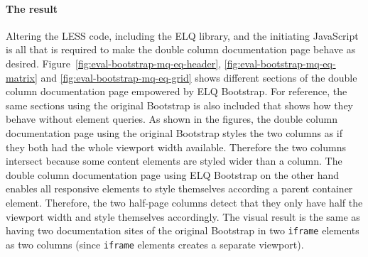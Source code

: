 \documentclass[a4paper,11pt]{kth-mag}
\newcommand{\code}[1]{\texttt{#1}}
\begin{document}
      \paragraph{The result}
      Altering the \gls{LESS} code, including the \gls{ELQ} library, and the initiating \gls{JavaScript} is all that is required to make the double column documentation page behave as desired.
      Figure~\ref{fig:eval-bootstrap-mq-eq-header}, \ref{fig:eval-bootstrap-mq-eq-matrix} and \ref{fig:eval-bootstrap-mq-eq-grid} shows different sections of the double column documentation page empowered by \gls{ELQ} \gls{Bootstrap}.
      For reference, the same sections using the original \gls{Bootstrap} is also included that shows how they behave without element queries.
      As shown in the figures, the double column documentation page using the original \gls{Bootstrap} styles the two columns as if they both had the whole \gls{viewport} width available.
      Therefore the two columns intersect because some content \glspl{element} are styled wider than a column.
      The double column documentation page using \gls{ELQ} \gls{Bootstrap} on the other hand enables all \gls{responsive} \glspl{element} to style themselves according a parent container \gls{element}.
      Therefore, the two half-page columns detect that they only have half the \gls{viewport} width and style themselves accordingly.
      The visual result is the same as having two documentation sites of the original \gls{Bootstrap} in two \code{iframe} \glspl{element} as two columns (since \code{iframe} \glspl{element} creates a separate \gls{viewport}).
\end{document}
